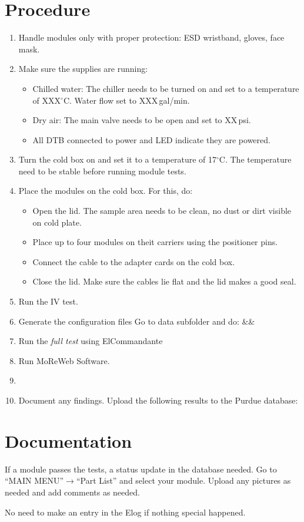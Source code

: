 \documentclass[12pt]{unlsilabsop}
\begin{document}
\section{Procedure}

\begin{enumerate}
    \item Handle modules only with proper protection: ESD wristband, gloves, face mask.
    \item Make sure the supplies are running:
    \begin{itemize}
        \item Chilled water: The chiller needs to be turned on and set to a temperature of XXX$^\circ$C. Water flow set to XXX\,gal/min.
        \item Dry air: The main valve needs to be open and set to XX\,psi.
        \item All DTB connected to power and LED indicate they are powered.
    \end{itemize}
    \item Turn the cold box on and set it to a temperature of 17$^\circ$C. The temperature need to be stable before running module tests.
    \item Place the modules on the cold box. For this, do:
    \begin{itemize}
        \item Open the lid. The sample area needs to be clean, no dust or dirt visible on cold plate.
        \item Place up to four modules on theit carriers using the positioner pins.
        \item Connect the cable to the adapter cards on the cold box.
        \item Close the lid. Make sure the cables lie flat and the lid makes a good seal.
    \end{itemize}
    \item Run the IV test.
		\item Generate the configuration files
        Go to data subfolder and do:
        \&& 
    \item Run the \emph{full test} using ElCommandante
    \item Run MoReWeb Software.
    		\item 
    \item Document any findings. Upload the following results to the Purdue database:
\end{enumerate}

\section{Documentation}
If a module passes the tests, a status update in the database needed. Go to ``MAIN MENU''$\rightarrow$``Part List'' and select your module. Upload any pictures as needed and add comments as needed.

No need to make an entry in the Elog if nothing special happened.
\end{document}
